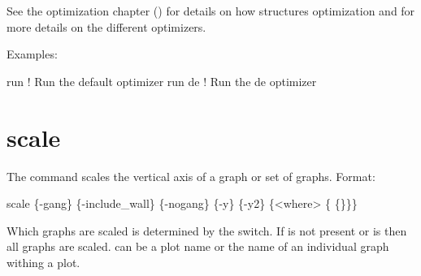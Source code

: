 See the optimization chapter () for details on how \tao structures optimization and for
more details on the different optimizers.

Examples:
\begin{example}
  run         ! Run the default optimizer
  run de      ! Run the de optimizer
\end{example}

\section{scale}
\label{s:scale}

The  command scales the vertical axis of a graph or set of graphs.  Format:
\begin{example}
  scale \{-gang\} \{-include_wall\} \{-nogang\} \{-y\} \{-y2\} \{<where> \{<value1> \{<value2>\}\}\}
\end{example}

Which graphs are scaled is determined by the  switch. If  is not
present or  is  then all graphs are scaled.  can be a plot
name or the name of an individual graph withing a plot.

